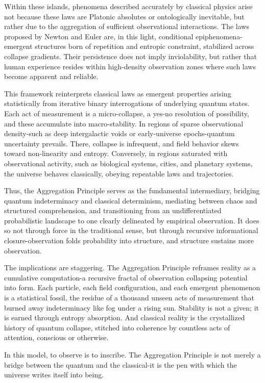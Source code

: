 Within these islands, phenomena described accurately by classical physics arise not because these laws are Platonic absolutes or ontologically inevitable, but rather due to the aggregation of sufficient observational interactions. The laws proposed by Newton and Euler are, in this light, conditional epiphenomena-emergent structures born of repetition and entropic constraint, stabilized across collapse gradients. Their persistence does not imply inviolability, but rather that human experience resides within high-density observation zones where such laws become apparent and reliable.

This framework reinterprets classical laws as emergent properties arising statistically from iterative binary interrogations of underlying quantum states. Each act of measurement is a micro-collapse, a yes-no resolution of possibility, and these accumulate into macro-stability. In regions of sparse observational density-such as deep intergalactic voids or early-universe epochs-quantum uncertainty prevails. There, collapse is infrequent, and field behavior skews toward non-linearity and entropy. Conversely, in regions saturated with observational activity, such as biological systems, cities, and planetary systems, the universe behaves classically, obeying repeatable laws and trajectories.

Thus, the Aggregation Principle serves as the fundamental intermediary, bridging quantum indeterminacy and classical determinism, mediating between chaos and structured comprehension, and transitioning from an undifferentiated probabilistic landscape to one clearly delineated by empirical observation. It does so not through force in the traditional sense, but through recursive informational closure-observation folds probability into structure, and structure sustains more observation.

The implications are staggering. The Aggregation Principle reframes reality as a cumulative computation-a recursive fractal of observation collapsing potential into form. Each particle, each field configuration, and each emergent phenomenon is a statistical fossil, the residue of a thousand unseen acts of measurement that burned away indeterminacy like fog under a rising sun. Stability is not a given; it is earned through entropy absorption. And classical reality is the crystallized history of quantum collapse, stitched into coherence by countless acts of attention, conscious or otherwise.

In this model, to observe is to inscribe. The Aggregation Principle is not merely a bridge between the quantum and the classical-it is the pen with which the universe writes itself into being.

